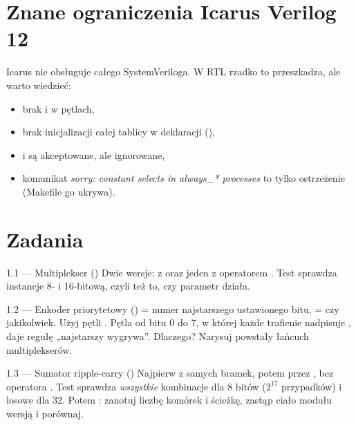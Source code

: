 \section{Znane ograniczenia Icarus Verilog 12}

Icarus nie obsługuje całego SystemVeriloga. W RTL rzadko to przeszkadza, ale
warto wiedzieć:
\begin{itemize}
  \item brak  i  w pętlach,
  \item brak inicjalizacji całej tablicy w deklaracji (),
  \item {} i  są akceptowane, ale ignorowane,
  \item komunikat \emph{sorry: constant selects in always\_* processes} to tylko
    ostrzeżenie (Makefile go ukrywa).
\end{itemize}

\section{Zadania}

\begin{zadanie}{1.1 --- Multiplekser ()}
Dwie wersje:  z  oraz jeden  z
operatorem . Test sprawdza instancje 8- i 16-bitową, czyli też to, czy
parametr działa.
\end{zadanie}

\begin{zadanie}{1.2 --- Enkoder priorytetowy ()}
 = numer najstarszego ustawionego bitu,  = czy jakikolwiek.
Użyj pętli . Pętla od bitu 0 do 7, w której każde trafienie nadpisuje
, daje regułę „najstarszy wygrywa”. Dlaczego? Narysuj powstały
łańcuch multiplekserów.
\end{zadanie}

\begin{zadanie}{1.3 --- Sumator ripple-carry ()}
Najpierw  z samych bramek, potem  przez
, bez operatora \code{+}. Test sprawdza \emph{wszystkie}
kombinacje dla 8 bitów ($2^{17}$ przypadków) i losowe dla 32. Potem
: zanotuj liczbę komórek i ścieżkę, zastąp ciało
modułu wersją  i porównaj.
\end{zadanie}

